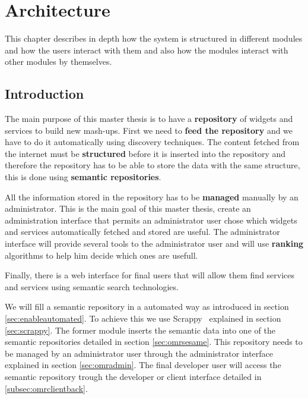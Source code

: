 \chapter{Architecture}
\label{chap:architecture}


\begin{chapterintro}
This chapter describes in depth how the system is structured in different modules and how the users interact with them and also how the modules interact with other modules by themselves.
\end{chapterintro}

\cleardoublepage
\section{Introduction}
The main purpose of this master thesis is to have a \textbf{repository} of widgets and services to build new mash-ups. First we need to \textbf{feed the repository} and we have to do it automatically using discovery techniques. The content fetched from the internet must be \textbf{structured} before it is inserted into the repository and therefore the repository has to be able to store the data with the same structure, this is done using \textbf{semantic repositories}.

All the information stored in the repository has to be \textbf{managed} manually by an administrator. This is the main goal of this master thesis, create an administration interface that permits an administrator user chose which widgets and services automatically fetched and stored are useful. The administrator interface will provide several tools to the administrator user and will use \textbf{ranking} algorithms to help him decide which ones are usefull.

Finally, there is a web interface for final users that will allow them find services and services using semantic search technologies.

We will fill a semantic repository in a automated way as introduced in section \ref{sec:enableautomated}. To achieve this we use Scrappy~\cite{fernandez2011semantic} explained in section \ref{sec:scrappy}. The former module inserts the semantic data into one of the semantic repositories detailed in section \ref{sec:omrsesame}. This repository needs to be managed by an administrator user through the administrator interface explained in section \ref{sec:omradmin}. The final developer user will access the semantic repository trough the developer or client interface detailed in \ref{subsec:omrclientback}.


